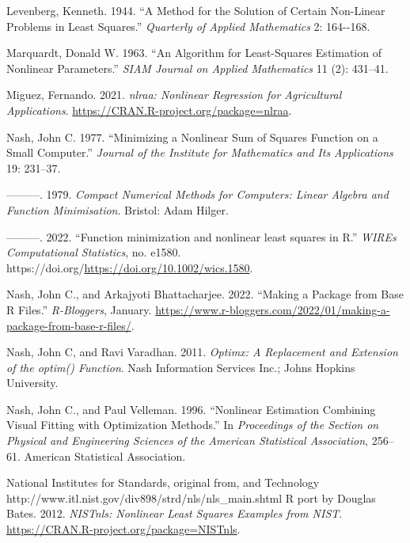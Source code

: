 \documentclass[
]{article}
\newlength{\cslhangindent}
\newlength{\cslentryspacingunit} %
\newenvironment{CSLReferences}[2] %
 {%
  \setlength{\parindent}{0pt}
  \ifodd #1
  \let\oldpar\par
  \def\par{\hangindent=\cslhangindent\oldpar}
  \fi
  \setlength{\parskip}{#2\cslentryspacingunit}
 }%
 {}
\begin{document}
\begin{CSLReferences}{1}{0}
\leavevmode{}%
Levenberg, Kenneth. 1944. {``A Method for the Solution of Certain
Non-Linear Problems in Least Squares.''} \emph{Quarterly of Applied
Mathematics} 2: 164-\/-168.

\leavevmode{}%
Marquardt, Donald W. 1963. {``{An Algorithm for Least-Squares Estimation
of Nonlinear Parameters}.''} \emph{SIAM Journal on Applied Mathematics}
11 (2): 431--41.

\leavevmode{}%
Miguez, Fernando. 2021. \emph{{nlraa: Nonlinear Regression for
Agricultural Applications}}.
\url{https://CRAN.R-project.org/package=nlraa}.

\leavevmode{}%
Nash, John C. 1977. {``Minimizing a Nonlinear Sum of Squares Function on
a Small Computer.''} \emph{Journal of the Institute for Mathematics and
Its Applications} 19: 231--37.

\leavevmode{}%
---------. 1979. \emph{Compact Numerical Methods for Computers: Linear
Algebra and Function Minimisation}. Bristol: Adam Hilger.

\leavevmode{}%
---------. 2022. {``{Function minimization and nonlinear least squares
in R}.''} \emph{WIREs Computational Statistics}, no. e1580.
https://doi.org/\url{https://doi.org/10.1002/wics.1580}.

\leavevmode{}%
Nash, John C., and Arkajyoti Bhattacharjee. 2022. {``Making a Package
from Base {R} Files.''} \emph{R-Bloggers}, January.
\url{https://www.r-bloggers.com/2022/01/making-a-package-from-base-r-files/}.

\leavevmode{}%
Nash, John C, and Ravi Varadhan. 2011. \emph{\emph{Optimx}: A
Replacement and Extension of the {optim()} Function}. Nash Information
Services Inc.; Johns Hopkins University.

\leavevmode{}%
Nash, John C., and Paul Velleman. 1996. {``Nonlinear Estimation
Combining Visual Fitting with Optimization Methods.''} In
\emph{Proceedings of the Section on Physical and Engineering Sciences of
the American Statistical Association}, 256--61. American Statistical
Association.

\leavevmode{}%
National Institutes for Standards, original from, and Technology
http://www.itl.nist.gov/div898/strd/nls/nls\_main.shtml R port by
Douglas Bates. 2012. \emph{NISTnls: Nonlinear Least Squares Examples
from NIST}. \url{https://CRAN.R-project.org/package=NISTnls}.


\end{CSLReferences}
\end{document}
